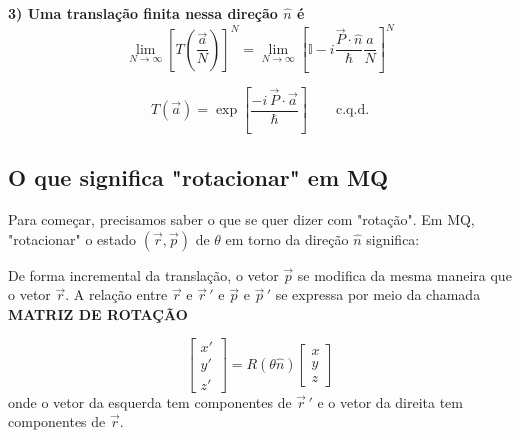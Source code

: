 \textbf{3) Uma translação finita nessa direção $\hat{n}$ é}
\begin{equation}
    \lim_{N\to\infty}\left[T\left(\frac{\vec{a}}{N}\right)\right]^N = \lim_{N\to\infty}\left[\mathbb{I} - i\frac{\vec{P}\cdot\hat{n}}{\hbar}\frac{a}{N}\right]^N
\label{eq:aula21_T_finita_limite}
\end{equation}

\begin{equation}
    \boxed{T(\vec{a}) = \exp\left[\frac{-i\,\vec{P}\cdot\vec{a}}{\hbar}\right]} \qquad \text{c.q.d.}
\label{eq:aula21_T_finita_resultado}
\end{equation}

\subsection*{O que significa "rotacionar" em MQ}

Para começar, precisamos saber o que se quer dizer com "rotação". Em MQ, "rotacionar" o estado $(\vec{r}, \vec{p})$ de $\theta$ em torno da direção $\hat{n}$ significa:

\begin{center}
\end{center}

De forma incremental da translação, o vetor $\vec{p}$ se modifica da mesma maneira que o vetor $\vec{r}$. A relação entre $\vec{r}$ e $\vec{r}\,'$ e $\vec{p}$ e $\vec{p}\,'$ se expressa por meio da chamada \textbf{MATRIZ DE ROTAÇÃO}

\begin{equation}
    \begin{bmatrix} x' \\ y' \\ z' \end{bmatrix}
    =
    R(\theta\hat{n})
    \begin{bmatrix} x \\ y \\ z \end{bmatrix}
\label{eq:aula21_matriz_rotacao}
\end{equation}
onde o vetor da esquerda tem componentes de $\vec{r}\,'$ e o vetor da direita tem componentes de $\vec{r}$.

